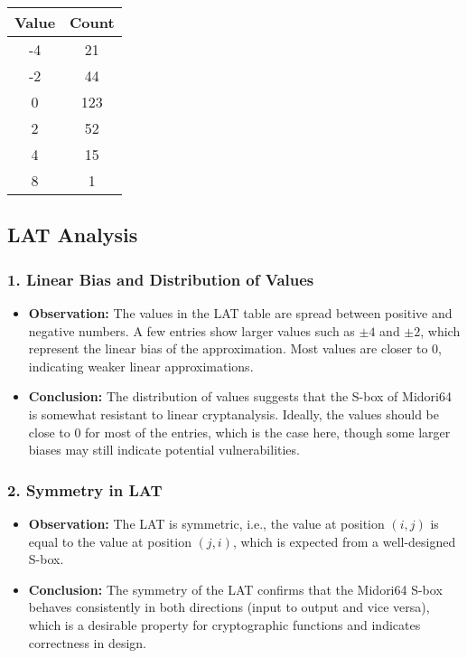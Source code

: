 \documentclass[10pt, a4paper]{article}
\begin{document}
\begin{table}[h!]
	\centering
	\begin{tabular}{|c|c|}
		\hline
		\textbf{Value} & \textbf{Count} \\
		\hline
		-4             & 21             \\
		-2             & 44             \\
		0              & 123            \\
		2              & 52             \\
		4              & 15             \\
		8              & 1              \\
		\hline
	\end{tabular}
\end{table}

\subsection*{LAT Analysis}

\subsubsection*{1. Linear Bias and Distribution of Values}
\begin{itemize}
	\item \textbf{Observation:} The values in the LAT table are spread between
	      positive and negative numbers. A few entries show larger values such as $\pm
		      4$ and $\pm 2$, which represent the linear bias of the approximation. Most
	      values are closer to 0, indicating weaker linear approximations.
	\item \textbf{Conclusion:} The distribution of values suggests that the
	      S-box of Midori64 is somewhat resistant to linear cryptanalysis. Ideally,
	      the values should be close to 0 for most of the entries, which is the case
	      here, though some larger biases may still indicate potential
	      vulnerabilities.
\end{itemize}

\subsubsection*{2. Symmetry in LAT}
\begin{itemize}
	\item \textbf{Observation:} The LAT is symmetric, i.e., the value at
	      position $(i, j)$ is equal to the value at position $(j, i)$, which is
	      expected from a well-designed S-box.
	\item \textbf{Conclusion:} The symmetry of the LAT confirms that the
	      Midori64 S-box behaves consistently in both directions (input to output and
	      vice versa), which is a desirable property for cryptographic functions and
	      indicates correctness in design.
\end{itemize}
\end{document}
